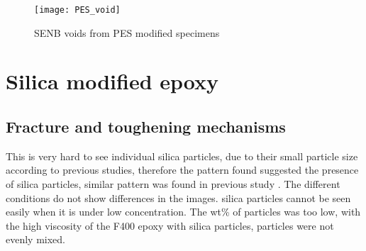 \documentclass[numbers=noendperiod,chapterprefix=on]{icldt} %
\begin{document}
{\begin{figure}[!htpb]
\centering
\texttt{[image: PES\_void]}
\caption{SENB voids from PES modified specimens} \label{PES_void}
\end{figure}
\FloatBarrier



%
%
%

\section{Silica modified epoxy}







\subsection{Fracture and toughening mechanisms}

This is very hard to see individual silica particles, due to their small particle size according to previous studies, therefore the pattern found suggested the presence of silica particles, similar pattern was found in previous study \cite{Hsieh2010a}.
The different conditions do not show differences in the images. 
silica particles cannot be seen easily when it is under low concentration. The wt\% of particles was too low, with the high viscosity of the F400 epoxy with silica particles, particles were not evenly mixed. 

}
\end{document}
